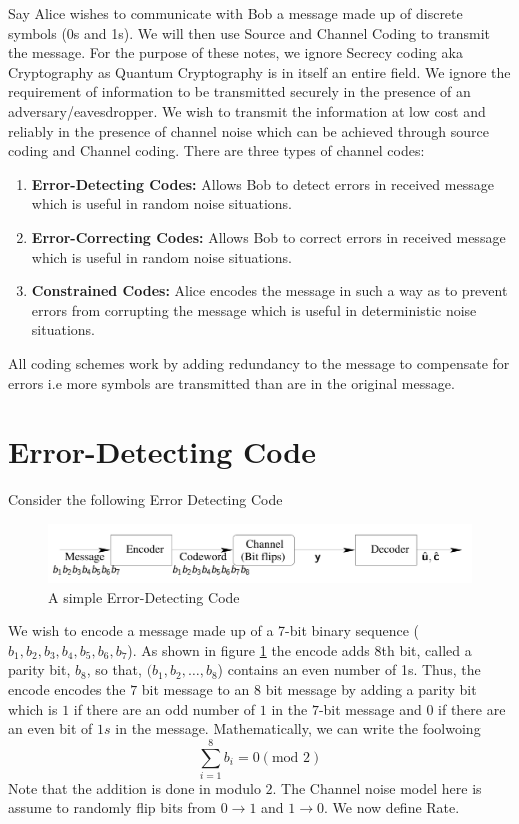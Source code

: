 \documentclass[12pt, oneside]{book}
\theoremstyle{definition}
\theoremstyle{definition}
\theoremstyle{remark}
\begin{document}
Say Alice wishes to communicate with Bob a message made up of discrete symbols (0s and 1s). We will then use Source and Channel Coding to transmit the message. For the purpose of these notes, we ignore Secrecy coding aka Cryptography as Quantum Cryptography is in itself an entire field. We ignore the requirement of information to be transmitted securely in the presence of an adversary/eavesdropper. We wish to transmit the information at low cost and reliably in the presence of channel noise which can be achieved through source coding and Channel coding. There are three types of channel codes:
\begin{enumerate}
    \item \textbf{Error-Detecting Codes:} Allows Bob to detect errors in received message which is useful in random noise situations.
    \item \textbf{Error-Correcting Codes:} Allows Bob to correct errors in received message which is useful in random noise situations.
    \item \textbf{Constrained Codes:} Alice encodes the message in such a way as to prevent errors from corrupting the message which is useful in deterministic noise situations.
\end{enumerate}
\begin{importantnote}
    All coding schemes work by adding redundancy to the message to compensate for errors i.e more symbols are transmitted than are in the original message.
\end{importantnote}

\section{Error-Detecting Code}
Consider the following Error Detecting Code
\begin{figure}[h]
    \centering
    \includegraphics[width=0.75\linewidth]{Images/error-dect.png}
    \caption{A simple Error-Detecting Code}
    \label{fig:err-det}
\end{figure}
We wish to encode a message made up of a 7-bit binary sequence ($b_1,b_2,b_3,b_4,b_5,b_6,b_7$). As shown in figure \ref{fig:err-det} the encode adds 8th bit, called a parity bit, $b_8$, so that, $(b_1,b_2,\ldots,b_8$) contains an even number of 1s. Thus, the encode encodes the $7$ bit message to an $8$ bit message by adding a parity bit which is $1$ if there are an odd number of $1$ in the $7$-bit message and $0$ if there are an even bit of $1s$ in the message. Mathematically, we can write the foolwoing 
\[
\sum_{i=1}^{8} b_i=0 (\text{mod }2)
\]
Note that the addition is done in modulo $2$. The Channel noise model here is assume to randomly flip bits from $0\rightarrow 1$ and $1\rightarrow 0$. We now define Rate.
\end{document}

